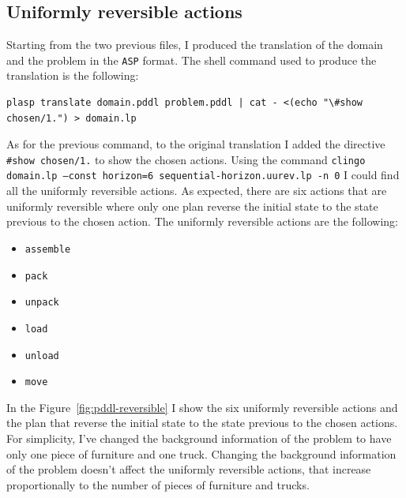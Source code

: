 \documentclass[12pt]{article}
\begin{document}
    \subsection{Uniformly reversible actions}\label{subsec:pddl-reversible}
    Starting from the two previous files, I produced the translation of the domain and the problem in the \texttt{ASP} format.
    The shell command used to produce the translation is the following:
\begin{verbatim}
plasp translate domain.pddl problem.pddl | cat - <(echo "\#show chosen/1.") > domain.lp
\end{verbatim}
    As for the previous command, to the original translation I added the directive \texttt{\#show chosen/1.} to show the chosen actions.
    Using the command \texttt{clingo domain.lp --const horizon=6 sequential-horizon.uurev.lp -n 0} I could find all the uniformly reversible actions.
    As expected, there are six actions that are uniformly reversible where only one plan reverse the initial state to the state previous to the chosen action.
    The uniformly reversible actions are the following:
    \begin{itemize}
        \item \texttt{assemble}
        \item \texttt{pack}
        \item \texttt{unpack}
        \item \texttt{load}
        \item \texttt{unload}
        \item \texttt{move}
    \end{itemize}
    In the Figure~\ref{fig:pddl-reversible} I show the six uniformly reversible actions and the plan that reverse the initial state to the state previous to the chosen actions.
    For simplicity, I've changed the background information of the problem to have only one piece of furniture and one truck.
    Changing the background information of the problem doesn't affect the uniformly reversible actions, that increase proportionally to the number of pieces of furniture and trucks.
\end{document}
